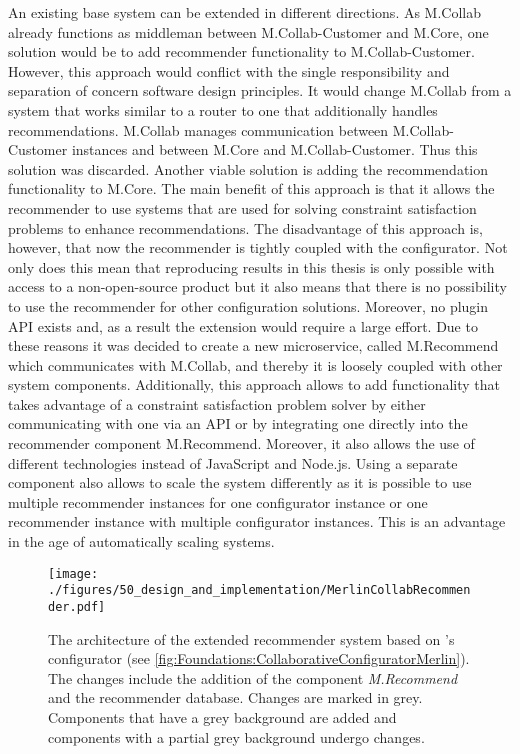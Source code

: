 An existing base system can be extended in different directions. As M.Collab already functions as middleman between M.Collab-Customer and M.Core, one solution would be to add recommender functionality to M.Collab-Customer. However, this approach would conflict with the single responsibility and separation of concern software design principles. It would change M.Collab from a system that works similar to a router to one that additionally handles  recommendations. M.Collab manages communication between M.Collab-Customer instances and between M.Core and M.Collab-Customer. Thus this solution was discarded.
Another viable solution is adding the recommendation functionality to M.Core. The main benefit of this approach is that it allows the recommender to use systems that are used for solving constraint satisfaction problems to enhance recommendations. The disadvantage of this approach is, however, that now the recommender is tightly coupled with the configurator. Not only does this mean that reproducing results in this thesis is only possible with access to a non-open-source product but it also means that there is no possibility to use the recommender for other configuration solutions. Moreover, no plugin API exists and, as a result the extension would require a large effort. 
Due to these reasons it was decided to create a new microservice, called M.Recommend which communicates with M.Collab, and thereby it is loosely coupled with other system components. Additionally, this approach allows to add functionality that takes  advantage of a constraint satisfaction problem solver by either communicating with one via an API or by integrating one directly into the recommender component M.Recommend. Moreover, it also allows the use of different technologies instead of JavaScript and Node.js. Using a separate component also allows to scale the system differently as it is possible to use multiple recommender instances for one configurator instance or one recommender instance with multiple configurator instances. This is an advantage in the age of automatically scaling systems.

\begin{figure}
    \centering
    \texttt{[image: ./figures/50\_design\_and\_implementation/MerlinCollabRecommender.pdf]}
    \caption{The architecture of the extended recommender system based on \cite[Fig. 4.3]{raabKollaborativeProduktkonfigurationEchtzeit2019}'s configurator (see \autoref{fig:Foundations:CollaborativeConfiguratorMerlin}). The changes include the addition of the component \emph{M.Recommend} and the recommender database. Changes are marked in grey. Components that have a grey background are added and components with a partial grey background undergo changes.}
    \label{fig:DesignImplementation:RecommenderForCollaborativeConfiguratorMerlin}
\end{figure}

